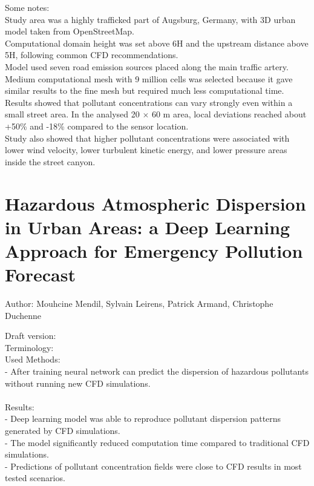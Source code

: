 \documentclass[12pt,a4paper]{article}
\begin{document}
Some notes:\\
Study area was a highly trafficked part of Augsburg, Germany, with 3D urban model taken from OpenStreetMap. \\
Computational domain height was set above 6H and the upstream distance above 5H, following common CFD recommendations. \\
Model used seven road emission sources placed along the main traffic artery. \\
Medium computational mesh with 9 million cells was selected because it gave similar results to the fine mesh but required much less computational time. \\
Results showed that pollutant concentrations can vary strongly even within a small street area. In the analysed 20 $\times$ 60 m area, local deviations reached about +50\% and -18\% compared to the sensor location. \\
Study also showed that higher pollutant concentrations were associated with lower wind velocity, lower turbulent kinetic energy, and lower pressure areas inside the street canyon. \\



\section{Hazardous Atmospheric Dispersion in Urban Areas: a
Deep Learning Approach for Emergency Pollution
Forecast}

Author: Mouhcine Mendil, Sylvain Leirens, Patrick Armand, Christophe Duchenne

Draft version:\\

Terminology: \\

Used Methods: \\
- After training neural network can predict the dispersion of hazardous pollutants without running new CFD simulations. \\
\\

Results: \\
- Deep learning model was able to reproduce pollutant dispersion patterns generated by CFD simulations. \\
- The model significantly reduced computation time compared to traditional CFD simulations. \\
- Predictions of pollutant concentration fields were close to CFD results in most tested scenarios. \\
\\
\end{document}
